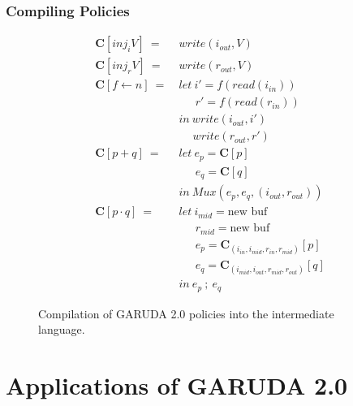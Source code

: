 \documentclass[12pt, letterpaper]{article}
\def \sysname {\textsc{GARUDA 2.0}\xspace}
\begin{document}
      \subsubsection{Compiling Policies}\label{sec:compile:compile:pol}
        \begin{figure}
          \begin{align*}
            \mathbf{C}[inj_iV]\ 
              =\ &
              write(i_{out}, V)\\
            \mathbf{C}[inj_rV]\ 
              =\ &
              write(r_{out}, V)\\
            \mathbf{C}[f \leftarrow n]\ 
              =\ &
              let\ i' = f(read(i_{in}))\\
              &\quad\ \ r' = f(read(r_{in}))\\
              &in\ write(i_{out}, i')\\
              &\quad \ write(r_{out}, r')\\
            \mathbf{C}[p + q]\ 
              =\ &
              let\ e_p = \mathbf{C}[p]\\
              &\quad\ \ e_q = \mathbf{C}[q]\\
              &in\ Mux(e_p, e_q, (i_{out},r_{out}))\\
            \mathbf{C}[p \cdot q]\ 
              =\ &
              let\ i_{mid} = \text{new buf}\\
              &\quad\ \ r_{mid} = \text{new buf}\\
              &\quad\ \ e_p = \mathbf{C}_{(i_{in}, i_{mid}, r_{in}, r_{mid})}[p]\\
              &\quad\ \ e_q = \mathbf{C}_{(i_{mid}, i_{out}, r_{mid}, r_{out})}[q]\\
              &in\ e_p\ ;\ e_q
          \end{align*}
          \caption{Compilation of \sysname policies into the intermediate language.}
          \label{fig:compile:compile:pol}
        \end{figure}


  \clearpage
  \section{Applications of \sysname}
\end{document}
